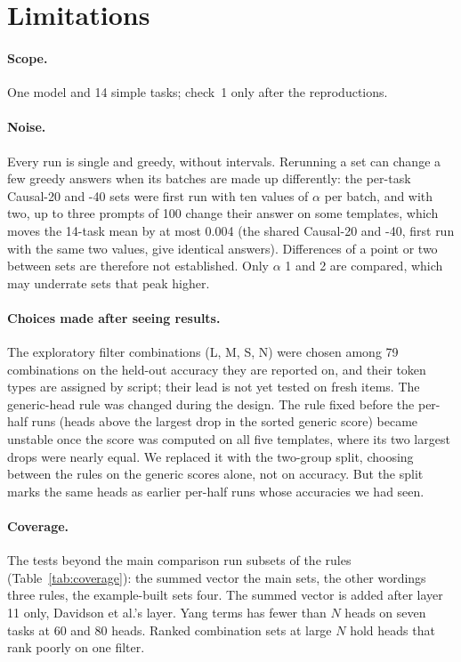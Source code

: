 \documentclass[10pt,a4paper]{article}
\begin{document}
\section{Limitations}

\paragraph{Scope.} One model and 14 simple tasks; check~1 only after the reproductions.

\paragraph{Noise.} Every run is single and greedy, without intervals. Rerunning a set can change a few greedy answers when its batches are made up differently: the per-task Causal-20 and -40 sets were first run with ten values of $\alpha$ per batch, and with two, up to three prompts of 100 change their answer on some templates, which moves the 14-task mean by at most 0.004 (the shared Causal-20 and -40, first run with the same two values, give identical answers). Differences of a point or two between sets are therefore not established. Only $\alpha$ 1 and 2 are compared, which may underrate sets that peak higher.

\paragraph{Choices made after seeing results.} The exploratory filter combinations (L, M, S, N) were chosen among 79 combinations on the held-out accuracy they are reported on, and their token types are assigned by script; their lead is not yet tested on fresh items. The generic-head rule was changed during the design. The rule fixed before the per-half runs (heads above the largest drop in the sorted generic score) became unstable once the score was computed on all five templates, where its two largest drops were nearly equal. We replaced it with the two-group split, choosing between the rules on the generic scores alone, not on accuracy. But the split marks the same heads as earlier per-half runs whose accuracies we had seen.

\paragraph{Coverage.} The tests beyond the main comparison run subsets of the rules (Table~\ref{tab:coverage}): the summed vector the main sets, the other wordings three rules, the example-built sets four. The summed vector is added after layer 11 only, Davidson et al.'s layer. Yang terms has fewer than $N$ heads on seven tasks at 60 and 80 heads. Ranked combination sets at large $N$ hold heads that rank poorly on one filter.
\end{document}
